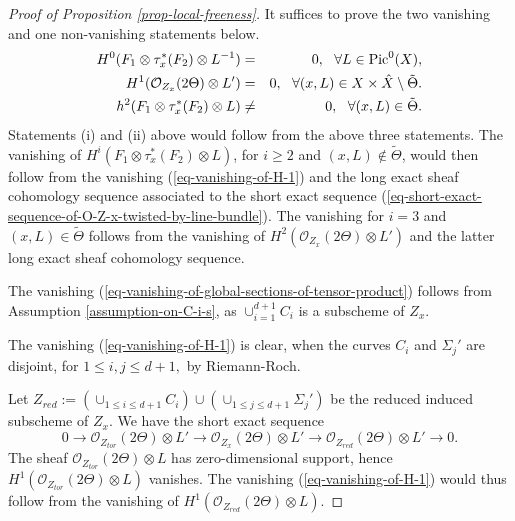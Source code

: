 \documentclass[12pt]{amsart}
\numberwithin{equation}{subsection}
\theoremstyle{plain}
\theoremstyle{definition}
\newcommand{\StructureSheaf}[1]{{\mathcal O}_{#1}}
\newcommand{\Pic}{{\rm Pic}}
\begin{document}
\begin{proof}[Proof of Proposition \ref{prop-local-freeness}]
It suffices to prove the two vanishing and one non-vanishing statements below. 
\begin{eqnarray}
\label{eq-vanishing-of-global-sections-of-tensor-product}
H^0(F_1\otimes \tau_x^*(F_2)\otimes L^{-1})&=&0, \ \ \forall L\in \Pic^0(X),
\\
\label{eq-vanishing-of-H-1}
H^1(\StructureSheaf{Z_x}(2\Theta)\otimes L')&=&0, \ \ \forall (x,L)\in X\times \hat{X}\setminus \tilde{\Theta}.
\\
\label{eq-non-vanishing-of-H-1-for-x-L-in-tilde-Theta}
h^2(F_1\otimes \tau_x^*(F_2)\otimes L)&\neq&0, \ \ \forall (x,L)\in \tilde{\Theta}.
\end{eqnarray}
Statements (i) and (ii) above would follow from the above three statements.
The vanishing of $H^i(F_1\otimes \tau_x^*(F_2)\otimes L)$, for $i\geq 2$ and $(x,L)\not\in \tilde{\Theta}$, would then follow from the vanishing (\ref{eq-vanishing-of-H-1}) and the long exact sheaf cohomology sequence associated to the short exact sequence (\ref{eq-short-exact-sequence-of-O-Z-x-twisted-by-line-bundle}).
The vanishing for $i=3$ and $(x,L)\in \tilde{\Theta}$ follows from the vanishing of $H^2(\StructureSheaf{Z_x}(2\Theta)\otimes L')$ and 
the latter long exact sheaf cohomology sequence.

The vanishing (\ref{eq-vanishing-of-global-sections-of-tensor-product}) follows from Assumption \ref{assumption-on-C-i-s}, as $\cup_{i=1}^{d+1}C_i$ is a subscheme of $Z_x$.

The vanishing (\ref{eq-vanishing-of-H-1}) is clear, when the curves $C_i$ and $\Sigma_j'$ are disjoint, for $1\leq i,j\leq d+1,$
by Riemann-Roch. 


Let $Z_{red}:=(\cup_{1\leq i\leq d+1}C_i)\cup (\cup_{1\leq j\leq d+1}\Sigma_j')$ be the reduced induced subscheme of $Z_x$.
We have the short exact sequence
\[
0\rightarrow \StructureSheaf{Z_{tor}}(2\Theta)\otimes L'\rightarrow \StructureSheaf{Z_x}(2\Theta)\otimes L'\rightarrow \StructureSheaf{Z_{red}}(2\Theta)\otimes L'\rightarrow 0.
\]
The sheaf $\StructureSheaf{Z_{tor}}(2\Theta)\otimes L$ has zero-dimensional support, hence
$H^1(\StructureSheaf{Z_{tor}}(2\Theta)\otimes L)$ vanishes. The vanishing (\ref{eq-vanishing-of-H-1}) would thus follow from the vanishing of $H^1(\StructureSheaf{Z_{red}}(2\Theta)\otimes L)$. 


\end{proof}
\end{document}
